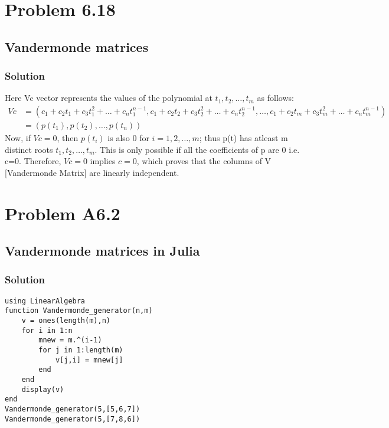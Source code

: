 \documentclass{article}
\begin{document}
\section*{Problem 6.18}
\subsection*{Vandermonde matrices}
\subsubsection*{Solution}
Here Vc vector represents the values of the polynomial at $t_1,t_2,\ldots,t_m$ as follows:
\begin{align*}
    Vc & = (c_1+c_2t_1+c_3t_1^2+\ldots+c_nt_1^{n-1}, c_1+c_2t_2+c_3t_2^2+\ldots+c_nt_2^{n-1},\ldots,c_1+c_2t_m+c_3t_m^2+\ldots+c_nt_m^{n-1})\\
    & = (p(t_1),p(t_2),\ldots,p(t_n))
\end{align*}
Now, if $Vc = 0$, then $p(t_i)$ is also 0 for $i =1,2,\ldots,m$; thus p(t) has atleast m distinct roots $t_1,t_2,\ldots,t_m$. This is only possible if all the coefficients of p are 0 i.e. c=0. Therefore, $Vc=0$ implies $c=0$, which proves that the columns of V [Vandermonde Matrix] are linearly independent. 
\section*{Problem A6.2}
\subsection*{Vandermonde matrices in Julia}
\subsubsection*{Solution}
\begin{verbatim}
using LinearAlgebra
function Vandermonde_generator(n,m)
    v = ones(length(m),n)
    for i in 1:n
        mnew = m.^(i-1)
        for j in 1:length(m)
            v[j,i] = mnew[j]
        end
    end
    display(v)
end
Vandermonde_generator(5,[5,6,7])
Vandermonde_generator(5,[7,8,6])
\end{verbatim}
\end{document}
